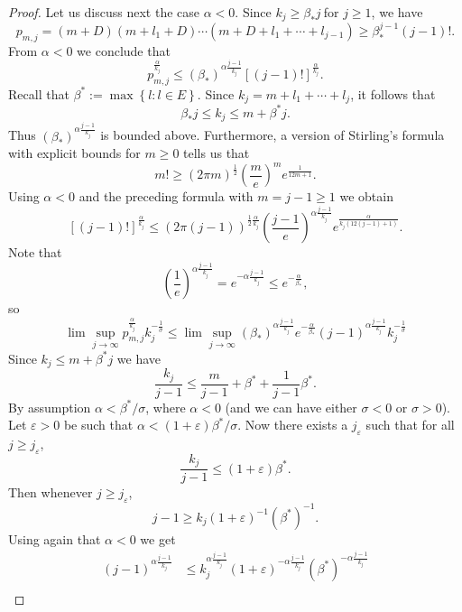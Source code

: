 \documentclass[12pt]{amsart}
\begin{document}
\begin{proof}
	Let us discuss next the case $\alpha<0.$ Since $k_{j}\geq\beta_{\ast}j\ $for
	$j\geq1$, we have
	\[
	p_{m,j}
	=
	\left(  m+D\right)  \left(  m+l_{1}+D\right)  \cdots\left(
	m+D+l_{1}+\cdots+l_{j-1}\right)  
	\geq
	\beta_{\ast}^{j-1}\left(  j-1\right)  !.
	\]
	From $\alpha<0$ we conclude that
	\[
	p_{m,j}^{\frac{\alpha}{k_{j}}}\leq\left(  \beta_{\ast}\right)^{\alpha
		\frac{j-1}{k_{j}}}\left[  \left(  j-1\right)  !\right]  ^{\frac{\alpha}{k_{j}%
	}}.
	\]
	Recall that  $\beta^{\ast} :=\max\left\{  l:l\in E\right\}.$ Since
	$k_{j}=m+l_{1}+\cdots+l_{j}$, it follows that
	\[
	\beta_{\ast}j\leq k_{j}\leq m+\beta^{\ast}j.
	\]
	Thus $\left(  \beta_{\ast}\right)  ^{\alpha\frac{j-1}{k_{j}}}$ is bounded above.
	Furthermore, a version of Stirling's formula 
	with explicit bounds for $m \ge 0$ tells us that
	\[
	m!\geq\left(  2\pi m\right)  ^{\frac{1}{2}}\left(  \frac{m}{e}\right)
	^{m}e^{\frac{1}{12m+1}}.
	\]
	Using $\alpha<0$ and the preceding formula with $m=j-1 \ge 1$ we obtain
	\[
	\left[  \left(  j-1\right)  !\right]  ^{\frac{\alpha}{k_{j}}}\leq\left(
	2\pi\left(  j-1\right)  \right)  ^{\frac{1}{2}\frac{\alpha}{k_{j}}}\left(
	\frac{j-1}{e}\right)  ^{\alpha\frac{j-1}{k_{j}}}e^{\frac{\alpha}{k_j (12\left(
			j-1\right)  +1)}}.
	\]
	Note that
	\[
	\left(  \frac{1}{e}\right)  ^{\alpha\frac{j-1}{k_{j}}}=e^{-\alpha\frac
		{j-1}{k_{j}}}\leq e^{-\frac{\alpha}{\beta_{\ast}}},
	\]
	so
	\[
	\lim\sup_{j\rightarrow\infty}p_{m,j}^{\frac{\alpha}{k_{j}}}k_{j}^{-\frac{1}{\sigma}
	}
	\leq
	\lim\sup_{j\rightarrow\infty}  \left(  \beta_{\ast}\right)^{\alpha
		\frac{j-1}{k_{j}}} e^{-\frac{\alpha}{\beta_{\ast}}}\left(
	j-1\right)  ^{\alpha\frac{j-1}{k_{j}}}k_{j}^{-\frac{1}{\sigma}}
	\]
	Since $k_{j}\leq m+\beta^{\ast}j$ we have
	\[
	\frac{k_{j}}{j-1}
	\leq
	\frac{m}
	{j-1}+\beta^{\ast}+\frac{1}{j - 1}\beta^{\ast}.
	\]
	By assumption $\alpha  < \beta^{\ast}/  \sigma$, where $\alpha < 0$ (and we can have either $\sigma < 0$ or $\sigma > 0$). Let $\varepsilon>0$ be such that $\alpha <  (1 + \varepsilon)\beta^{\ast}/\sigma$. Now there exists a $j_{\varepsilon}$ such that for all
	$j\geq j_{\varepsilon}$,
	\[
	\frac{k_{j}}{j-1}\leq\left(  1+\varepsilon\right)  \beta^{\ast}.
	\]
	Then whenever $j\geq j_{\varepsilon}$,
	\[
	j-1
	\geq
	k_{j}\left(
	1+\varepsilon\right)^{-1}\left(  \beta^{\ast}\right)^{-1}.
	\]
	Using again that $\alpha<0$ we get
	\begin{align*}
		\left(  j-1\right)  ^{\alpha\frac{j-1}{k_{j}}} &  \leq k_{j}^{\alpha\frac
			{j-1}{k_{j}}}\left(  1+\varepsilon\right)  ^{-\alpha\frac{j-1}{k_{j}}}\left(
		\beta^{\ast}\right)  ^{-\alpha\frac{j-1}{k_{j}}}\\

\end{align*}
\end{proof}
\end{document}
